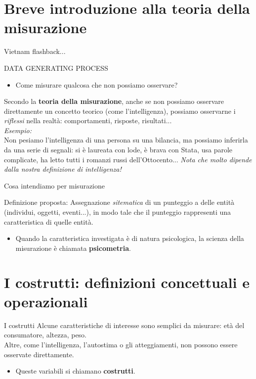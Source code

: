 \documentclass{beamer}
\begin{document}
\section{Breve introduzione alla teoria della misurazione}
\begin{frame}{Vietnam flashback...}
\begin{center}
   {\huge \alert{DATA GENERATING PROCESS}} 
\end{center}
\vspace{0.5cm}
\begin{itemize}
    \item Come misurare qualcosa che non possiamo osservare?
\end{itemize}
\pause
\vspace{0.5cm}
Secondo la \textbf{teoria della misurazione}, anche se non possiamo osservare direttamente un concetto teorico (come l'intelligenza), possiamo osservarne i {\it riflessi} nella realtà: comportamenti, risposte, risultati... \\
\vspace{0.5 cm}
\footnotesize
{\it Esempio:} \\
Non pesiamo l'intelligenza di una persona su una bilancia, ma possiamo inferirla da una serie di segnali: si è laureata con lode, è brava con Stata, usa parole complicate, ha letto tutti i romanzi russi dell'Ottocento... {\it Nota che molto dipende dalla nostra definizione di intelligenza!}
\end{frame}

\begin{frame}{Cosa intendiamo per misurazione}
\begin{block}{Definizione proposta:}
    Assegnazione \textit{sitematica} di un punteggio a delle entità (individui, oggetti, eventi...), in modo tale che il punteggio rappresenti una caratteristica di quelle entità.
\end{block}
\pause
\begin{itemize}
    \item Quando la caratteristica investigata è di natura psicologica, la scienza della misurazione è chiamata \textbf{psicometria}.
\end{itemize}
\end{frame}

\section{I costrutti: definizioni concettuali e operazionali}
\begin{frame}{I costrutti}
Alcune caratteristiche di interesse sono semplici da misurare: età del consumatore, altezza, peso. \\ Altre, come l’intelligenza, l’autostima o gli atteggiamenti, non possono essere osservate direttamente.
\begin{itemize}
    \item Queste variabili si chiamano \textbf{costrutti}.
\end{itemize}
\end{frame}
\end{document}
